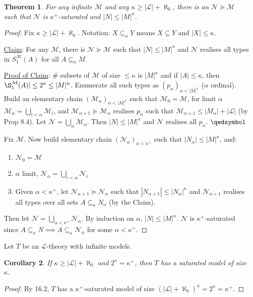 \documentclass[]{article}
\theoremstyle{custhm}
\newtheorem{theorem}{Theorem}[section]
\theoremstyle{cusdef}
\theoremstyle{custhm}
\theoremstyle{custhm}
\newtheorem{cor}[theorem]{Corollary}
\theoremstyle{custhm}
\theoremstyle{ex}
\theoremstyle{custhm}
\theoremstyle{cusdef}
\theoremstyle{remark}
\theoremstyle{remark}
\renewcommand{\L}{\mathcal{L}}
\newcommand{\M}{\mathcal{M}}
\newcommand{\N}{\mathcal{N}}
\renewcommand{\subset}{\subseteq}
\begin{document}
\begin{theorem}
	For any infinite $\M$ and any $\kappa \ge |\L| + \aleph_0$, there is an $\N\succeq\M$ such that $\N$ is $\kappa^+$-saturated and $|N| \le |M|^\kappa$.
\end{theorem}
\begin{proof}
	Fix $\kappa \ge |\L| + \aleph_0$. Notation: $X\subset_\kappa Y$ means $X\subset Y$ and $|X| \le \kappa$.

	\underline{Claim}: For any $\M$, there is $\N\succeq\M$ such that $|N|\le |M|^\kappa$ and $\N$ realises all types in $S_1^\M(A)$ for all $A\subset_\kappa M$.

	\underline{Proof of Claim}: \# subsets of $\M$ of size $\le \kappa$ is $|M|^\kappa$ and if $|A|\le \kappa$, then $\S_1^\M(A)| \le 2^\kappa\le |M|^\kappa$. Enumerate all such types as $(p_\alpha)_{\alpha < |M|^\kappa}$ ($\alpha$ ordinal). Build an elementary chain $(\M_\alpha)_{\alpha < |M|^\kappa}$ such that $\M_0 = \M$, for limit $\alpha$ $\M_\alpha = \bigcup_{i<\alpha}\M_i$, and $\M_{\alpha+1} \succeq \M_\alpha$ realises $p_\alpha$ such that $\M_{\alpha+1} \le |M_\alpha| + |\L|$ (by Prop 8.4). Let $\N = \bigcup_\alpha \M_\alpha$. Then $|N| \le |M|^\kappa$ and $\N$ realises all $p_\alpha$. $\qedsymbol$

	Fix $\M$. Now build elementary chain $(\N_\alpha)_{\alpha < \kappa^+}$ such that $|N_\alpha| \le |M|^\kappa$, and:
	\begin{enumerate}
		\item $\N_0 = \M$
		\item $\alpha$ limit, $\N_\alpha = \bigcup_{i<\alpha}\N_i$
		\item Given $\alpha < \kappa^+$, let $\N_{\alpha+1}\succeq \N_\alpha$ such that $|N_{\alpha+1}| \le |N_\alpha|^\kappa$ and $\N_{\alpha+1}$ realises all types over all sets $A\subset_\kappa N_{\alpha}$ (by the Claim).
	\end{enumerate}
	Then let $\N = \bigcup_{\alpha < \kappa^+}\N_\alpha$. By induction on $\alpha$, $|N|\le |M|^\kappa$. $\N$ is $\kappa^+$-saturated since $A\subset_\kappa N\implies A\subset_\kappa \N_\alpha$ for some $\alpha < \kappa^+$.
\end{proof}

Let $T$ be an $\L$-theory with infinite models.

\begin{cor}
	If $\kappa \ge |\L|+\aleph_0$ and $2^\kappa = \kappa^+$, then $T$ has a saturated model of size $\kappa$.
\end{cor}
\begin{proof}
	By 16.2, $T$ has a $\kappa^+$-saturated model of size $(|\L|+\aleph_0)^\kappa = 2^\kappa = \kappa^+$.
\end{proof}
\end{document}
